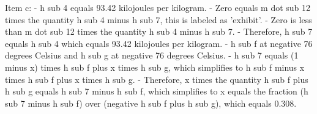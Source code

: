 Item c:
- h sub 4 equals 93.42 kilojoules per kilogram.
- Zero equals m dot sub 12 times the quantity h sub 4 minus h sub 7, this is labeled as 'exhibit'.
- Zero is less than m dot sub 12 times the quantity h sub 4 minus h sub 7.
- Therefore, h sub 7 equals h sub 4 which equals 93.42 kilojoules per kilogram.
- h sub f at negative 76 degrees Celsius and h sub g at negative 76 degrees Celsius.
- h sub 7 equals (1 minus x) times h sub f plus x times h sub g, which simplifies to h sub f minus x times h sub f plus x times h sub g.
- Therefore, x times the quantity h sub f plus h sub g equals h sub 7 minus h sub f, which simplifies to x equals the fraction (h sub 7 minus h sub f) over (negative h sub f plus h sub g), which equals 0.308.
